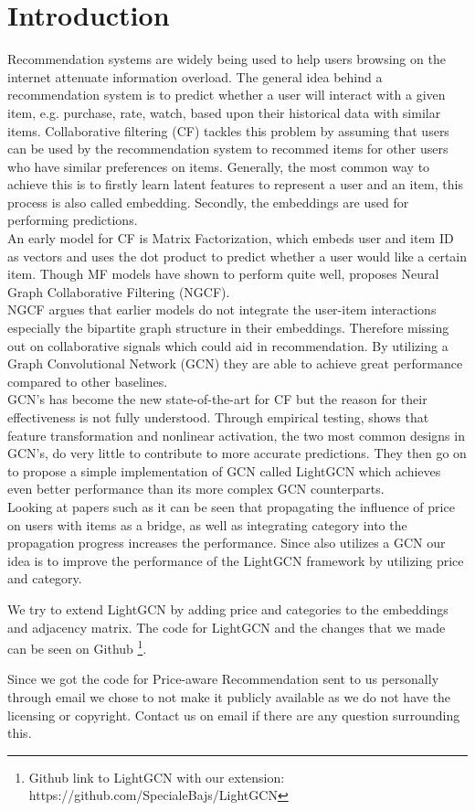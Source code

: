 \section{Introduction}
Recommendation systems are widely being used to help users browsing on the internet attenuate information overload\cite{YT_rec,Pint_rec}.
The general idea behind a recommendation system is to predict whether a user will interact with a given item, e.g. purchase, rate, watch, based upon their historical data with similar items.
Collaborative filtering (CF) tackles this problem by assuming that users can be used by the recommendation system to recommed items for other users who have similar preferences on items.
Generally, the most common way to achieve this is to firstly learn latent features to represent a user and an item, this process is also called embedding.
Secondly, the embeddings are used for performing predictions.
\\
An early model for CF is Matrix Factorization, which embeds user and item ID as vectors and uses the dot product to predict whether a user would like a certain item.
Though MF models have shown to perform quite well, \cite{NGCF_2019} proposes Neural Graph Collaborative Filtering (NGCF).
\\ 
NGCF argues that earlier models do not integrate the user-item interactions especially the bipartite graph structure in their embeddings.
Therefore missing out on collaborative signals which could aid in recommendation.
By utilizing a Graph Convolutional Network (GCN) they are able to achieve great performance compared to other baselines.
\\
GCN's has become the new state-of-the-art for CF but the reason for their effectiveness is not fully understood\cite{lightgcn}.
Through empirical testing, \cite{lightgcn} shows that feature transformation and nonlinear activation, the two most common designs in GCN's, do very little to contribute to more accurate predictions.
They then go on to propose a simple implementation of GCN called LightGCN which achieves even better performance than its more complex GCN counterparts.
\\
Looking at papers such as \cite{Priceaware} it can be seen that propagating the influence of price on users with items as a bridge, as well as integrating category into the propagation progress increases the performance.
Since \cite{Priceaware} also utilizes a GCN our idea is to improve the performance of the LightGCN framework by utilizing price and category.

We try to extend LightGCN by adding price and categories to the embeddings and adjacency matrix.
The code for LightGCN and the changes that we made can be seen on Github \footnote{Github link to LightGCN with our extension: https://github.com/SpecialeBajs/LightGCN}.

Since we got the code for Price-aware Recommendation sent to us personally through email we chose to not make it publicly available as we do not have the licensing or copyright.
Contact us on email if there are any question surrounding this.
